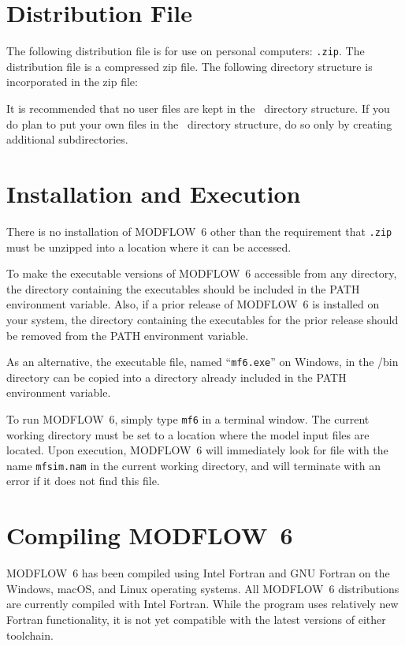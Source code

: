 \documentclass[11pt,twoside,twocolumn]{usgsreport}
\begin{document}
\section{Distribution File}
The following distribution file is for use on personal computers: \texttt{\modflowversion.zip}.  The distribution file is a compressed zip file. The following directory structure is incorporated in the zip file:



It is recommended that no user files are kept in the \modflowversion~directory structure.  If you do plan to put your own files in the \modflowversion~directory structure, do so only by creating additional subdirectories.

\section{Installation and Execution}
There is no installation of MODFLOW~6 other than the requirement that \texttt{\modflowversion.zip} must be unzipped into a location where it can be accessed.  

To make the executable versions of MODFLOW~6 accessible from any directory, the directory containing the executables should be included in the PATH environment variable.  Also, if a prior release of MODFLOW~6 is installed on your system, the directory containing the executables for the prior release should be removed from the PATH environment variable.

As an alternative, the executable file, named ``\texttt{mf6.exe}'' on Windows, in the \modflowversion{}/bin directory can be copied into a directory already included in the PATH environment variable.

To run MODFLOW~6, simply type \texttt{mf6} in a terminal window.  The current working directory must be set to a location where the model input files are located.  Upon execution, MODFLOW~6 will immediately look for file with the name \texttt{mfsim.nam} in the current working directory, and will terminate with an error if it does not find this file.

\section{Compiling MODFLOW~6}
MODFLOW~6 has been compiled using Intel Fortran and GNU Fortran on the Windows, macOS, and Linux operating systems.  All MODFLOW~6 distributions are currently compiled with Intel Fortran.  While the program uses relatively new Fortran functionality, it is not yet compatible with the latest versions of either toolchain.
\end{document}
